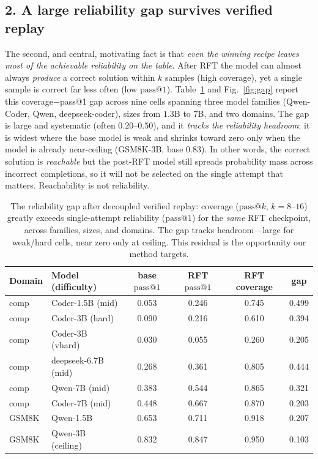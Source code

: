 \subsection*{2. A large reliability gap survives verified replay}

The second, and central, motivating fact is that \emph{even the winning recipe
leaves most of the achievable reliability on the table}. After RFT the model can
almost always \emph{produce} a correct solution within $k$ samples (high
coverage), yet a single sample is correct far less often (low $\text{pass}@1$).
Table~\ref{tab:gap} and Fig.~\ref{fig:gap} report this coverage$-$pass@1 gap
across nine cells spanning three model families (Qwen-Coder, Qwen, deepseek-coder),
sizes from $1.3$B to $7$B, and two domains. The gap is large and systematic
(often $0.20$--$0.50$), and it \emph{tracks the reliability headroom}: it is
widest where the base model is weak and shrinks toward zero only when the model
is already near-ceiling (GSM8K-3B, base $0.83$). In other words, the correct
solution is \emph{reachable} but the post-RFT model still spreads probability mass
across incorrect completions, so it will not be selected on the single attempt
that matters. Reachability is not reliability.

\begin{table}[htbp]
\centering
\caption{The reliability gap after decoupled verified replay: coverage
($\text{pass}@k$, $k{=}8$--$16$) greatly exceeds single-attempt reliability
($\text{pass}@1$) for the \emph{same} RFT checkpoint, across families, sizes, and
domains. The gap tracks headroom---large for weak/hard cells, near zero only at
ceiling. This residual is the opportunity our method targets.}
\label{tab:gap}
\begin{tabular}{llcccc}
\toprule
Domain & Model (difficulty) & base $\text{pass}@1$ & RFT $\text{pass}@1$ & RFT coverage & gap \\
\midrule
comp  & Coder-1.5B (mid)     & 0.053 & 0.246 & 0.745 & 0.499 \\
comp  & Coder-3B (hard)      & 0.090 & 0.216 & 0.610 & 0.394 \\
comp  & Coder-3B (vhard)     & 0.030 & 0.055 & 0.260 & 0.205 \\
comp  & deepseek-6.7B (mid)  & 0.268 & 0.361 & 0.805 & 0.444 \\
comp  & Qwen-7B (mid)        & 0.383 & 0.544 & 0.865 & 0.321 \\
comp  & Coder-7B (mid)       & 0.448 & 0.667 & 0.870 & 0.203 \\
GSM8K & Qwen-1.5B            & 0.653 & 0.711 & 0.918 & 0.207 \\
GSM8K & Qwen-3B (ceiling)    & 0.832 & 0.847 & 0.950 & 0.103 \\
\bottomrule
\end{tabular}
\end{table}

